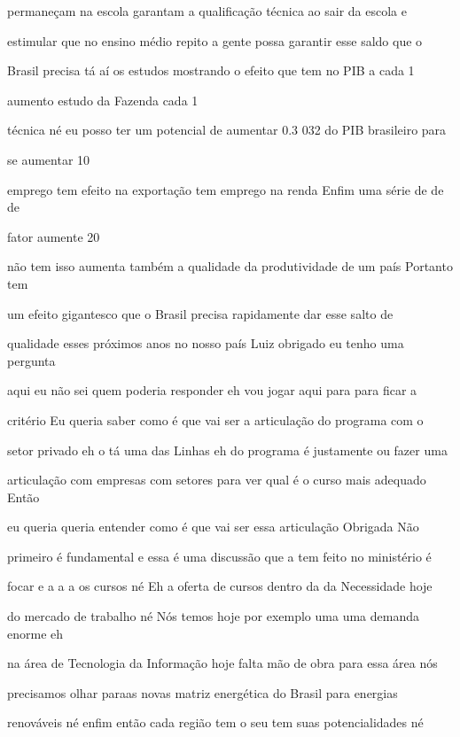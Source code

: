 \documentclass[a4paper,12pt]{article}
\begin{document}
permaneçam na escola garantam a qualificação técnica ao sair da escola e

estimular que no ensino médio repito a gente possa garantir esse saldo que o

Brasil precisa tá aí os estudos mostrando o efeito que tem no PIB a cada 1%

aumento estudo da Fazenda cada 1%

técnica né eu posso ter um potencial de aumentar 0.3 032 do PIB brasileiro para

se aumentar 10%

emprego tem efeito na exportação tem emprego na renda Enfim uma série de de de

fator aumente 20%

não tem isso aumenta também a qualidade da produtividade de um país Portanto tem

um efeito gigantesco que o Brasil precisa rapidamente dar esse salto de

qualidade esses próximos anos no nosso país Luiz obrigado eu tenho uma pergunta

aqui eu não sei quem poderia responder eh vou jogar aqui para para ficar a

critério Eu queria saber como é que vai ser a articulação do programa com o

setor privado eh o tá uma das Linhas eh do programa é justamente ou fazer uma

articulação com empresas com setores para ver qual é o curso mais adequado Então

eu queria queria entender como é que vai ser essa articulação Obrigada Não

primeiro é fundamental e essa é uma discussão que a tem feito no ministério é

focar e a a a os cursos né Eh a oferta de cursos dentro da da Necessidade hoje

do mercado de trabalho né Nós temos hoje por exemplo uma uma demanda enorme eh

na área de Tecnologia da Informação hoje falta mão de obra para essa área nós

precisamos olhar paraas novas matriz energética do Brasil para energias

renováveis né enfim então cada região tem o seu tem suas potencialidades né
\end{document}
